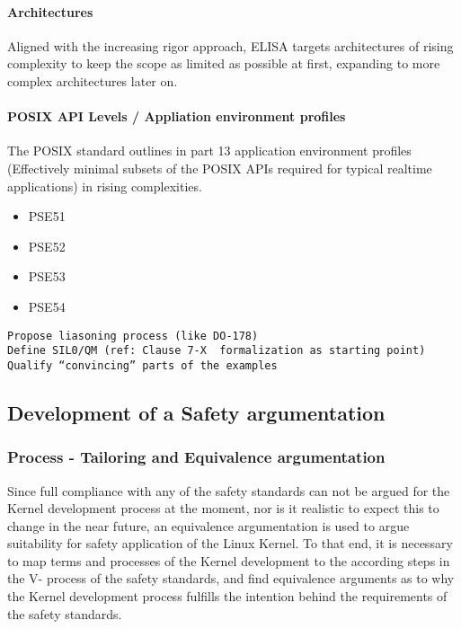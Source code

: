 \documentclass[12pt]{ElisaPaper}
\newcommand{\commentJK}[1]{\todo[linecolor=red,backgroundcolor=red!25,bordercolor=red]{#1}}
\begin{document}
\paragraph{Architectures}
Aligned with the increasing rigor approach, ELISA targets architectures of rising complexity to keep the scope as limited as possible at first, expanding to more complex architectures later on.
\paragraph{POSIX API Levels / Appliation environment profiles}
The POSIX standard  \cite{IEEE1003.1:2010} outlines in part 13 \cite{IEEE1003.13:2003} application environment profiles (Effectively minimal subsets of the POSIX APIs required for typical realtime applications) in rising complexities.
\begin{itemize}
\item PSE51
\item PSE52
\item PSE53
\item PSE54
\end{itemize}

\begin{verbatim}
Propose liasoning process (like DO-178)
Define SIL0/QM (ref: Clause 7-X  formalization as starting point)
Qualify “convincing” parts of the examples  
\end{verbatim}
\commentJK{Clarify what was meant by that}

\subsection{Development of a Safety argumentation}
\subsubsection{Process - Tailoring and Equivalence argumentation}
Since full compliance with any of the safety standards can not be argued for the Kernel development process at the moment, nor is it realistic to expect this to change in the near future, an equivalence argumentation is used to argue suitability for safety application of the Linux Kernel.
To that end, it is necessary to map terms and processes of the Kernel development to the according steps in the V- process of the safety standards, and find equivalence arguments as to why the Kernel development process fulfills the intention behind the requirements of the safety standards.
\end{document}
